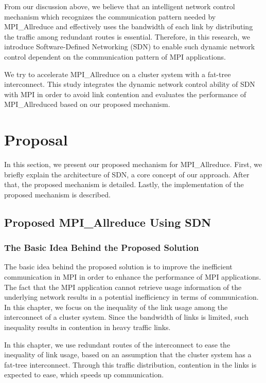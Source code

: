 From our discussion above, we believe that an intelligent network control
mechanism which recognizes the communication pattern needed by MPI\_Allreduce
and effectively uses the bandwidth of each link by distributing the traffic
among redundant routes is essential. Therefore, in this research, we introduce
Software-Defined Networking (SDN) to enable such dynamic network control
dependent on the communication pattern of MPI applications.

We try to accelerate MPI\_Allreduce on a cluster system with a fat-tree
interconnect. This study integrates the dynamic network control ability of SDN
with MPI in order to avoid link contention and evaluates the performance of
MPI\_Allreduced based on our proposed mechanism.

\section{Proposal}\label{sec:iii-proposal}

In this section, we present our proposed mechanism for
MPI\_Allreduce. First, we briefly explain the architecture of
SDN, a core concept of our approach. After that, the proposed mechanism
is detailed. Lastly, the implementation of the proposed mechanism is
described.

\subsection{Proposed MPI\_Allreduce Using SDN}

\subsubsection{The Basic Idea Behind the Proposed Solution}

The basic idea behind the proposed solution is to improve the
inefficient communication in MPI in order to enhance the performance of
MPI applications. The fact that the MPI application cannot retrieve
usage information of the underlying network results in a potential
inefficiency in terms of communication. In this chapter, we focus on the
inequality of the link usage among the interconnect of a cluster system. Since
the bandwidth of links is limited, such inequality results in contention in
heavy traffic links.

In this chapter, we use redundant routes of the interconnect to ease the
inequality of link usage, based on an assumption that the cluster system has a
fat-tree interconnect. Through this traffic distribution, contention in the
links is expected to ease, which speeds up communication.

